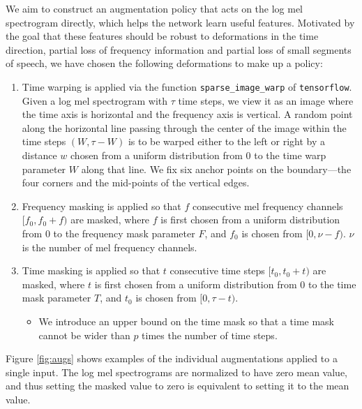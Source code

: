 \documentclass[a4paper]{article}
\begin{document}
We aim to construct an augmentation policy that acts on the log mel spectrogram directly, which helps the network learn useful features. Motivated by the goal that these features should be robust to deformations in the time direction, partial loss of frequency information and partial loss of small segments of speech, we have chosen the following deformations to make up a policy:
\begin{enumerate}
\item Time warping is applied via the function {\tt sparse\_image\_warp} of {\tt tensorflow}. Given a log mel spectrogram with $\tau$ time steps, we view it as an image where the time axis is horizontal and the frequency axis is vertical. A random point along the horizontal line passing through the center of the image within the time steps $(W, \tau-W)$ is to be warped either to the left or right by a distance $w$ chosen from a uniform distribution from 0 to the time warp parameter $W$ along that line.  We fix six anchor points on the boundary---the four corners and the mid-points of the vertical edges.
\item Frequency masking is applied so that $f$ consecutive mel frequency channels $[f_0, f_0 + f)$ are masked, where $f$ is first chosen from a uniform distribution from 0 to the frequency mask parameter $F$, and $f_0$ is chosen from $[0, \nu -f)$. $\nu$ is the number of mel frequency channels.
\item Time masking is applied so that $t$ consecutive time steps $[t_0, t_0 + t)$ are masked, where $t$ is first chosen from a uniform distribution from 0 to the time mask parameter $T$, and $t_0$ is chosen from $[0, \tau-t)$.
 \begin{itemize}
 \item We introduce an upper bound on the time mask so that a time mask cannot be wider than $p$ times the number of time steps.
 \end{itemize}
\end{enumerate}
Figure \ref{fig:augs} shows examples of the individual augmentations applied to a single input. The log mel spectrograms are normalized to have zero mean value, and thus setting the masked value to zero is equivalent to setting it to the mean value.
\end{document}
